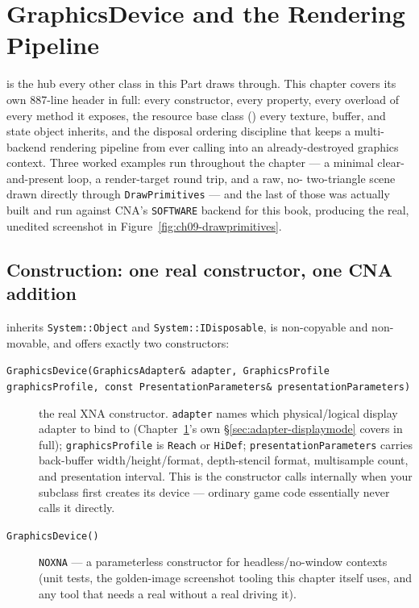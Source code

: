 \chapter{GraphicsDevice and the Rendering Pipeline}
\label{ch:graphicsdevice}

 is the hub every other class in this Part draws through. This
chapter covers its own 887-line header in full: every constructor, every property, every
overload of every method it exposes, the resource base class ()
every texture, buffer, and state object inherits, and the disposal ordering discipline that
keeps a multi-backend rendering pipeline from ever calling into an already-destroyed graphics
context. Three worked examples run throughout the chapter --- a minimal clear-and-present loop,
a render-target round trip, and a raw, no- two-triangle scene drawn
directly through \texttt{DrawPrimitives} --- and the last of those was actually built and run
against CNA's \texttt{SOFTWARE} backend for this book, producing the real, unedited screenshot
in Figure~\ref{fig:ch09-drawprimitives}.

\section{Construction: one real constructor, one CNA addition}

 inherits \texttt{System::Object} and \texttt{System::IDisposable},
is non-copyable and non-movable, and offers exactly two constructors:

\begin{description}
\item[\texttt{GraphicsDevice(GraphicsAdapter\& adapter, GraphicsProfile graphicsProfile, const PresentationParameters\& presentationParameters)}]
  the real XNA constructor. \texttt{adapter} names which physical/logical display adapter to
  bind to (Chapter~\ref{ch:graphicsdevice}'s own \S\ref{sec:adapter-displaymode} covers
   in full); \texttt{graphicsProfile} is \texttt{Reach} or
  \texttt{HiDef}; \texttt{presentationParameters} carries back-buffer width/height/format,
  depth-stencil format, multisample count, and presentation interval. This is the constructor
   calls internally when your  subclass first
  creates its device --- ordinary game code essentially never calls it directly.
\item[\texttt{GraphicsDevice()}]
  \texttt{NOXNA} --- a parameterless constructor for headless/no-window contexts (unit tests,
  the golden-image screenshot tooling this chapter itself uses, and any tool that needs a real
   without a real  driving it).
\end{description}

